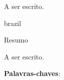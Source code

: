 \renewcommand{\sfdefault}{\rmdefault}
\begin{agradecimentos}[Agradecimentos]
    A ser escrito.

    
    
    
    
\end{agradecimentos}

\begin{otherlanguage*}{brazil}
\renewcommand{\sfdefault}{\rmdefault}
    \begin{center}{\ABNTEXchapterfont\huge Resumo}\end{center}
    A ser escrito.
    
    \noindent\textbf{Palavras-chaves}: 
    \vspace{\fill}
\end{otherlanguage*}
\cleardoublepage

